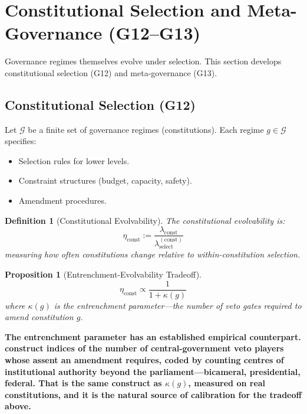 \documentclass[12pt]{article}
\newtheorem{proposition}[theorem]{Proposition}
\newtheorem{definition}[theorem]{Definition}
\newcommand{\added}[1]{\textbf{#1}}
\begin{document}

\section{Constitutional Selection and Meta-Governance (G12--G13)}
\label{sec:g12-g13}

Governance regimes themselves evolve under selection. This section develops constitutional selection (G12) and meta-governance (G13).

\subsection{Constitutional Selection (G12)}

Let $\mathcal{G}$ be a finite set of governance regimes (constitutions). Each regime $g \in \mathcal{G}$ specifies:
\begin{itemize}
    \item Selection rules for lower levels.
    \item Constraint structures (budget, capacity, safety).
    \item Amendment procedures.
\end{itemize}

\begin{definition}[Constitutional Evolvability]
The \emph{constitutional evolvability} is:
\[
\eta_{\mathrm{const}} := \frac{\lambda_{\mathrm{const}}}{\lambda_{\mathrm{select}}^{(\mathrm{const})}}
\]
measuring how often constitutions change relative to within-constitution selection.
\end{definition}

\begin{proposition}[Entrenchment-Evolvability Tradeoff]
\label{prop:entrenchment}
\[
\eta_{\mathrm{const}} \propto \frac{1}{1 + \kappa(g)}
\]
where $\kappa(g)$ is the \emph{entrenchment parameter}---the number of veto gates required to amend constitution $g$.
\end{proposition}

\noindent\added{The entrenchment parameter has an established empirical counterpart. \citet{rasch2006} construct indices of the number of central-government veto players whose assent an amendment requires, coded by counting centres of institutional authority beyond the parliament---bicameral, presidential, federal. That is the same construct as $\kappa(g)$, measured on real constitutions, and it is the natural source of calibration for the tradeoff above.}
\end{document}

